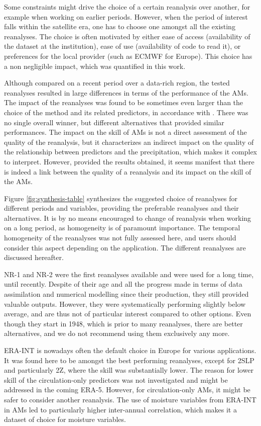 \documentclass{ametsoc}
\begin{document}
Some constraints might drive the choice of a certain reanalysis over another, for example when working on earlier periods. However, when the period of interest falls within the satellite era, one has to choose one amongst all the existing reanalyses. The choice is often motivated by either ease of access (availability of the dataset at the institution), ease of use (availability of code to read it), or  preferences for the local provider (such as ECMWF for Europe). This choice has a non negligible impact, which was quantified in this work.

Although compared on a recent period over a data-rich region, the tested reanalyses resulted in large differences in terms of the performance of the AMs. The impact of the reanalyses was found to be sometimes even larger than the choice of the method and its related predictors, in accordance with \citet{Dayon2015}. There was no single overall winner, but different alternatives that provided similar performances. The impact on the skill of AMs is not a direct assessment of the quality of the reanalysis, but it characterizes an indirect impact on the quality of the relationship between predictors and the precipitation, which makes it complex to interpret. However, provided the results obtained, it seems manifest that there is indeed a link between the quality of a reanalysis and its impact on the skill of the AMs.

Figure \ref{fig:synthesis-table} synthesizes the suggested choice of reanalyses for different periods and variables, providing the preferable reanalyses and their alternatives. It is by no means encouraged to change of reanalysis when working on a long period, as homogeneity is of paramount importance. The temporal homogeneity of the reanalyses was not fully assessed here, and users should consider this aspect depending on the application. The different reanalyses are discussed hereafter.

NR-1 and NR-2 were the first reanalyses available and were used for a long time, until recently. Despite of their age and all the progress made in terms of data assimilation and numerical modelling since their production, they still provided valuable outputs. However, they were systematically performing slightly below average, and are thus not of particular interest compared to other options. Even though they start in 1948, which is prior to many reanalyses, there are better alternatives, and we do not recommend using them exclusively any more.

ERA-INT is nowadays often the default choice in Europe for various applications. It was found here to be amongst the best performing reanalyses, except for 2SLP and particularly 2Z, where the skill was substantially lower. The reason for lower skill of the circulation-only predictors was not investigated and might be addressed in the coming ERA-5. However, for circulation-only AMs, it might be safer to consider another reanalysis. The use of moisture variables from ERA-INT in AMs led to particularly higher inter-annual correlation, which makes it a dataset of choice for moisture variables.
\end{document}
